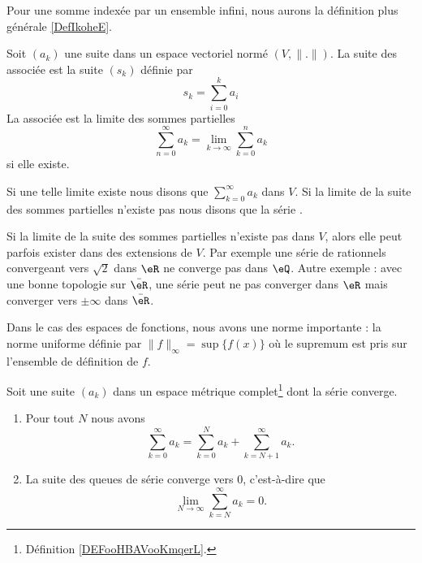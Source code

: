 Pour une somme indexée par un ensemble infini, nous aurons la définition plus générale \ref{DefIkoheE}.
\begin{definition}\label{DefGFHAaOL}
    Soit \( (a_k)\) une suite dans un espace vectoriel normé \( (V,\| . \| )\). La suite des  associée est la suite \( (s_k)\) définie par
    \begin{equation}
        s_k=\sum_{i=0}^ka_i
    \end{equation}
    La  associée est la limite des sommes partielles
    \begin{equation}
        \sum_{n=0}^{\infty}a_k=\lim_{k\to \infty} \sum_{k=0}^na_k
    \end{equation}
    si elle existe.

    Si une telle limite existe nous disons que \( \sum_{k=0}^{\infty}a_k\)  dans \( V\). Si la limite de la suite des sommes partielles n'existe pas nous disons que la série .
\end{definition}

\begin{remark}
    Si la limite de la suite des sommes partielles n'existe pas dans \( V\), alors elle peut parfois exister dans des extensions de \( V\). Par exemple une série de rationnels convergeant vers \( \sqrt{2}\) dans \( \eR\) ne converge pas dans \( \eQ\). Autre exemple : avec une bonne topologie sur \( \bar \eR\), une série peut ne pas converger dans \( \eR\) mais converger vers \( \pm\infty\) dans \( \bar \eR\).
\end{remark}

Dans le cas des espaces de fonctions, nous avons une norme importante : la norme uniforme définie par \( \| f \|_{\infty}=\sup\{ f(x) \}\) où le supremum est pris sur l'ensemble de définition de \( f\).

\begin{lemma}       \label{LEMooHUZEooSyPipb}
    Soit une suite \( (a_k)\) dans un espace métrique complet\footnote{Définition \ref{DEFooHBAVooKmqerL}.} dont la série converge.
    
    \begin{enumerate}
        \item   \label{ITEMooPFSQooDhKFGL}
            Pour tout \( N\) nous avons
            \begin{equation}
                \sum_{k=0}^{\infty}a_k=\sum_{k=0}^Na_k+\sum_{k=N+1}^{\infty}a_k.
            \end{equation}
        \item       \label{ITEMooQNHMooUPjupB}
            La suite des queues de série converge vers \( 0\), c'est-à-dire que
            \begin{equation}
                \lim_{N\to \infty} \sum_{k=N}^{\infty}a_k=0.
            \end{equation}
    \end{enumerate}
\end{lemma}

